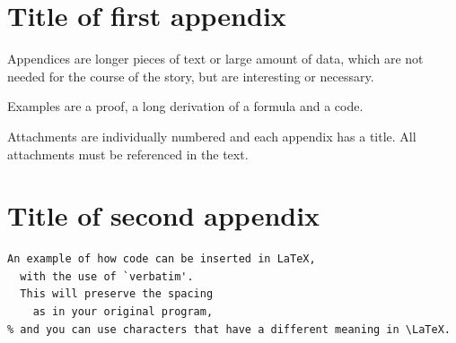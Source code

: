 \documentclass[11pt, a4paper, twoside]{report}
\begin{document}
\chapter{Title of first appendix} %
Appendices are longer pieces of text or large amount of data, which are not needed for the course of the story, but are interesting or necessary. 

Examples are a proof, a long derivation of a formula and a code. 

Attachments are individually numbered and each appendix has a title. All attachments must be referenced in the text.


\chapter{Title of second appendix} %
\begin{verbatim}
An example of how code can be inserted in LaTeX, 
  with the use of `verbatim'.
  This will preserve the spacing 
    as in your original program,
% and you can use characters that have a different meaning in \LaTeX.
\end{verbatim}

 
\end{document}
